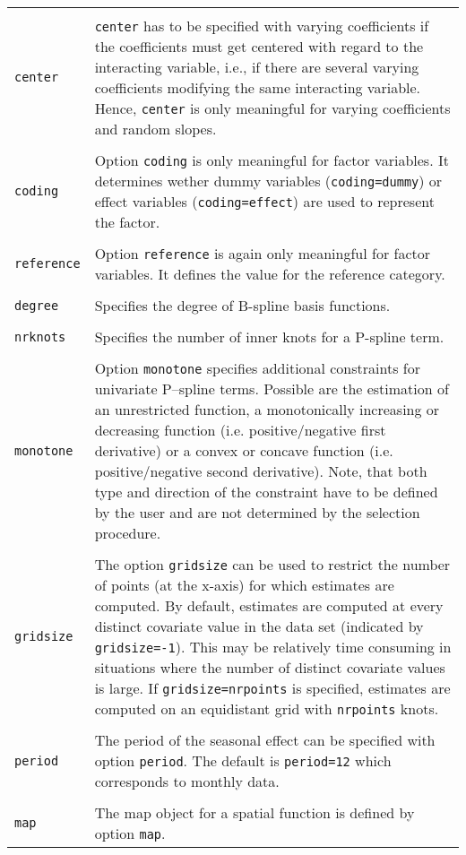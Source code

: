 \begin{longtable}{p{2.2cm} p{13.3cm}}
            & \\
{\tt center} & {\tt center} has to be specified with varying coefficients if the
               coefficients must get centered with regard to the interacting variable, i.e., if
               there are several varying coefficients modifying the same interacting variable.
               Hence, {\tt center} is only meaningful for varying coefficients and random slopes. \\
            & \\
{\tt coding} & Option {\tt coding} is only meaningful for factor variables. It determines wether
               dummy variables ({\tt coding=dummy}) or effect variables ({\tt coding=effect})
               are used to represent the factor. \\
            & \\
{\tt reference} & Option {\tt reference} is again only meaningful for factor variables. It defines
                  the value for the reference category. \\
            & \\
{\tt degree} & Specifies the degree of B-spline basis functions. \\
            & \\
{\tt nrknots} & Specifies the number of inner knots for a P-spline term. \\
            & \\
{\tt monotone} & Option {\tt monotone} specifies additional constraints for univariate
                 P--spline terms. Possible are the estimation of an unrestricted function,
                 a monotonically increasing or decreasing function (i.e. positive/negative first derivative)
                 or a convex or concave function (i.e. positive/negative second derivative).
                 Note, that both type and direction of the constraint have to be defined by the user and are
                 not determined by the selection procedure. \\
            & \\
{\tt gridsize} & The option {\tt gridsize} can be used to restrict the
                 number of points (at the x-axis) for which estimates are computed.
                 By default, estimates are computed at every distinct covariate
                 value in the data set (indicated by {\tt gridsize=-1}). This may be
                 relatively time consuming in situations where the number of
                 distinct covariate values is large. If {\tt gridsize=nrpoints} is
                 specified, estimates are computed
                 on an equidistant grid with {\tt nrpoints} knots. \\
            & \\
{\tt period} & The period of the seasonal effect can be specified with
               option {\tt period}. The default is {\tt period=12} which corresponds
               to monthly data. \\
            & \\
{\tt map} & The map object for a spatial function is defined by option {\tt map}.
\end{longtable}

